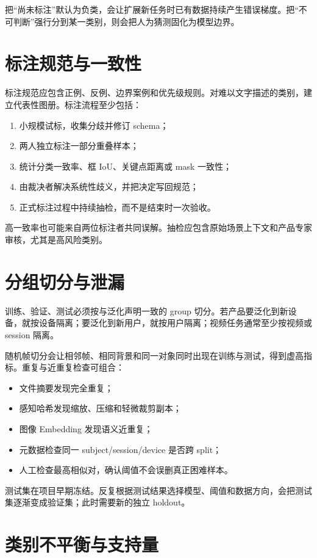 把“尚未标注”默认为负类，会让扩展新任务时已有数据持续产生错误梯度。把“不可判断”强行分到某一类别，则会把人为猜测固化为模型边界。

\section{标注规范与一致性}

标注规范应包含正例、反例、边界案例和优先级规则。对难以文字描述的类别，建立代表性图册。标注流程至少包括：

\begin{enumerate}
  \item 小规模试标，收集分歧并修订 schema；
  \item 两人独立标注一部分重叠样本；
  \item 统计分类一致率、框 IoU、关键点距离或 mask 一致性；
  \item 由裁决者解决系统性歧义，并把决定写回规范；
  \item 正式标注过程中持续抽检，而不是结束时一次验收。
\end{enumerate}

高一致率也可能来自两位标注者共同误解。抽检应包含原始场景上下文和产品专家审核，尤其是高风险类别。

\section{分组切分与泄漏}

训练、验证、测试必须按与泛化声明一致的 group 切分。若产品要泛化到新设备，就按设备隔离；要泛化到新用户，就按用户隔离；视频任务通常至少按视频或 session 隔离。

随机帧切分会让相邻帧、相同背景和同一对象同时出现在训练与测试，得到虚高指标。重复与近重复检查可组合：

\begin{itemize}
  \item 文件摘要发现完全重复；
  \item 感知哈希发现缩放、压缩和轻微裁剪副本；
  \item 图像 Embedding 发现语义近重复；
  \item 元数据检查同一 subject/session/device 是否跨 split；
  \item 人工检查最高相似对，确认阈值不会误删真正困难样本。
\end{itemize}

测试集在项目早期冻结。反复根据测试结果选择模型、阈值和数据方向，会把测试集逐渐变成验证集；此时需要新的独立 holdout。

\section{类别不平衡与支持量}

